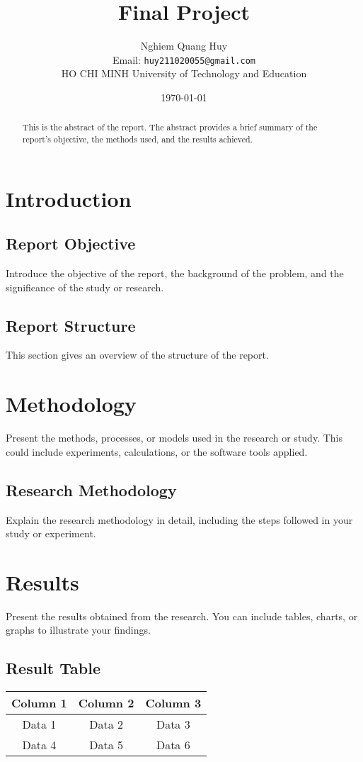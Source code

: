 \documentclass[a4paper,12pt]{article}
\title{Final Project}
\author{Nghiem Quang Huy \\ Email: \texttt{huy211020055@gmail.com} \\ HO CHI MINH University of Technology and Education}
\date{\today}
\begin{document}
\maketitle

\begin{abstract}
    This is the abstract of the report. The abstract provides a brief summary of the report’s objective, the methods used, and the results achieved.
\end{abstract}

\tableofcontents
\newpage

\section{Introduction}
\subsection{Report Objective}
Introduce the objective of the report, the background of the problem, and the significance of the study or research.

\subsection{Report Structure}
This section gives an overview of the structure of the report.

\section{Methodology}
Present the methods, processes, or models used in the research or study. This could include experiments, calculations, or the software tools applied.

\subsection{Research Methodology}
Explain the research methodology in detail, including the steps followed in your study or experiment.

\section{Results}
Present the results obtained from the research. You can include tables, charts, or graphs to illustrate your findings.

\subsection{Result Table}
\begin{longtable}{|c|c|c|}
    \hline
    \textbf{Column 1} & \textbf{Column 2} & \textbf{Column 3} \\
    \hline
    \endfirsthead
    \hline
    Data 1 & Data 2 & Data 3 \\
    Data 4 & Data 5 & Data 6 \\
    \hline
\end{longtable}
\end{document}
